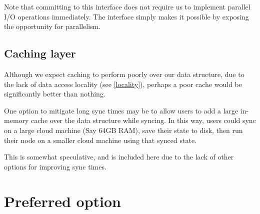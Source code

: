 \documentclass[11pt,a4paper]{article}
\begin{document}
Note that committing to this interface does not require us to implement
parallel I/O operations immediately. The interface simply makes it possible by
exposing the opportunity for parallelism.

\subsection{Caching layer}
\label{caching-layer}

Although we expect caching to perform poorly over our data structure, due to
the lack of data access locality (see \cref{locality}), perhaps a poor cache
would be significantly better than nothing.

One option to mitigate long sync times may be to allow users to add a large
in-memory cache over the data structure while syncing. In this way, users could
sync on a large cloud machine (Say 64GB RAM), save their state to disk, then run
their node on a smaller cloud machine using that synced state.

This is somewhat speculative, and is included here due to the lack of other
options for improving sync times.

\section{Preferred option}
\label{preferred}
\end{document}
